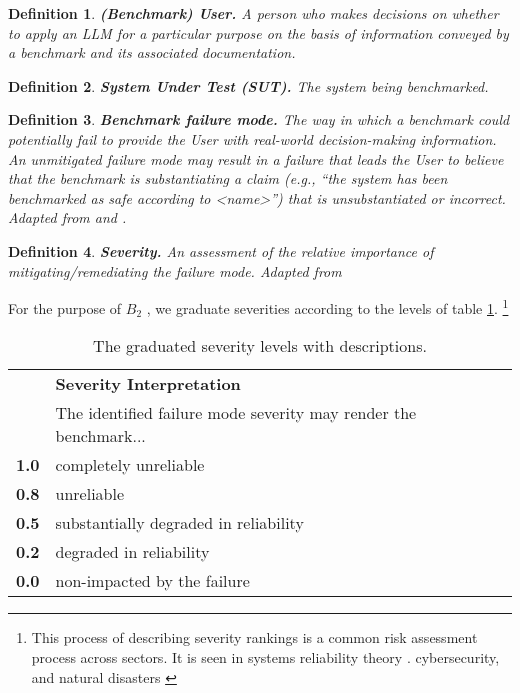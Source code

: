 \documentclass{article}
\newtheorem{dfn}{Definition}[section]
\newcommand\bb{$B_2$ }
\begin{document}
\begin{dfn}
{\bf (Benchmark) User.} A person who makes decisions on whether to apply an LLM for a particular purpose on the basis of information conveyed by a benchmark and its associated documentation.
\end{dfn}
\begin{dfn}
{\bf System Under Test (SUT).} The system being benchmarked.
\end{dfn}
\begin{dfn}
{\bf Benchmark failure mode.} The way in which a benchmark could potentially fail to provide the User with real-world decision-making information.  An unmitigated failure mode may result in a failure that leads the User to believe that the benchmark is substantiating a claim (e.g., ``the system has been benchmarked as safe according to <name>'') that is unsubstantiated or incorrect. Adapted from \cite{cnssi4009} and \cite{Rausand2004}.
\end{dfn}
\begin{dfn}
{\bf Severity.} An assessment of the relative importance of mitigating/remediating the failure mode.  Adapted from \cite{nist80030r1}
\end{dfn}

For the purpose of \bb, we graduate severities according to the levels of table \ref{tab:severity}. \footnote{This process of describing severity rankings is a common risk assessment process across sectors. It is seen in systems reliability theory \cite{Rausand2004}. cybersecurity, and natural disasters \cite{NaturalDisasterSeverity} }
\begin{table}[!ht]
  \caption{The graduated severity levels with descriptions.}
\label{tab:severity}
  \centering
  \begin{tabular}{lp{10cm}}
    \toprule
    & \textbf{Severity Interpretation} \\
    & The identified failure mode severity may render the benchmark...\\
    \midrule
    \textbf{1.0} & completely unreliable \\
    \textbf{0.8} & unreliable \\
    \textbf{0.5} & substantially degraded in reliability  \\
    \textbf{0.2} & degraded in reliability \\
    \textbf{0.0} & non-impacted by the failure\\
    \bottomrule
  \end{tabular}
\end{table}
\end{document}
